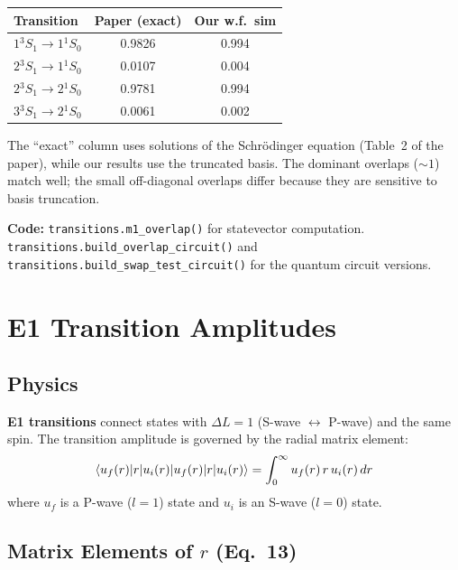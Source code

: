 \documentclass[11pt,a4paper]{article}
\begin{document}
\begin{center}
\begin{tabular}{l c c}
\toprule
Transition & Paper (exact) & Our w.f.\ sim \\
\midrule
$1{}^3S_1 \to 1{}^1S_0$ & 0.9826 & 0.994 \\
$2{}^3S_1 \to 1{}^1S_0$ & 0.0107 & 0.004 \\
$2{}^3S_1 \to 2{}^1S_0$ & 0.9781 & 0.994 \\
$3{}^3S_1 \to 2{}^1S_0$ & 0.0061 & 0.002 \\
\bottomrule
\end{tabular}
\end{center}

The ``exact'' column uses solutions of the Schr\"odinger equation (Table~2 of the paper), while our results use the truncated basis. The dominant overlaps ($\sim 1$) match well; the small off-diagonal overlaps differ because they are sensitive to basis truncation.

\vspace{0.3em}
\noindent\textbf{Code:} \texttt{transitions.m1\_overlap()} for statevector computation. \texttt{transitions.build\_overlap\_circuit()} and \texttt{transitions.build\_swap\_test\_circuit()} for the quantum circuit versions.


\section{E1 Transition Amplitudes}

\subsection{Physics}

\textbf{E1 transitions} connect states with $\Delta L = 1$ (S-wave $\leftrightarrow$ P-wave) and the same spin. The transition amplitude is governed by the radial matrix element:
\begin{equation}
  \braket{u_f(r) | r | u_i(r)} = \int_0^\infty u_f(r)\, r\, u_i(r)\, dr
\end{equation}
where $u_f$ is a P-wave ($l=1$) state and $u_i$ is an S-wave ($l=0$) state.

\subsection{Matrix Elements of $r$ (Eq.~13)}
\end{document}
